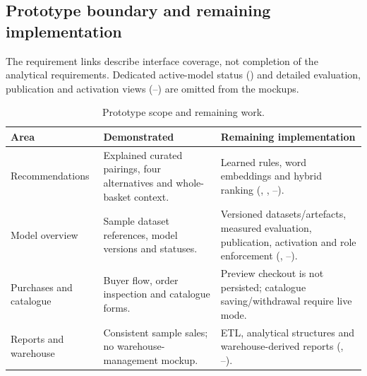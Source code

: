 \clearpage
\subsection{Prototype boundary and remaining implementation}
\label{sec:prototype-boundary}

The requirement links describe interface coverage, not completion of the
analytical requirements. Dedicated active-model status () and detailed
evaluation, publication and activation views (--) are omitted
from the mockups.

\begin{table}[H]
  \centering
  \caption{Prototype scope and remaining work.}
  \label{tab:prototype-boundary}
  \tablestyle
  \begin{tabularx}{\textwidth}{|L{2.6cm}|>{\RaggedRight\arraybackslash}X|>{\RaggedRight\arraybackslash}X|}
    \hline
    \textbf{Area} & \textbf{Demonstrated} & \textbf{Remaining implementation} \\\hline
    Recommendations & Explained curated pairings, four alternatives and
      whole-basket context. & Learned rules, word embeddings and hybrid ranking
      (, , --). \\\hline
    Model overview & Sample dataset references, model versions and statuses.
      & Versioned datasets/artefacts, measured evaluation, publication, activation
      and role enforcement (, --). \\\hline
    Purchases and catalogue & Buyer flow, order inspection and catalogue forms.
      & Preview checkout is not persisted; catalogue saving/withdrawal require
      live mode. \\\hline
    Reports and warehouse & Consistent sample sales; no warehouse-management
      mockup. & ETL, analytical structures and warehouse-derived reports
      (, --). \\\hline
  \end{tabularx}
\end{table}
